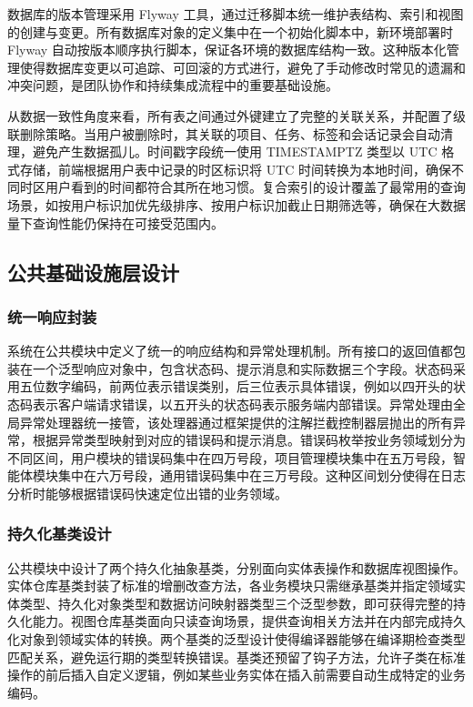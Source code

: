\par 数据库的版本管理采用 Flyway 工具，通过迁移脚本统一维护表结构、索引和视图的创建与变更。所有数据库对象的定义集中在一个初始化脚本中，新环境部署时 Flyway 自动按版本顺序执行脚本，保证各环境的数据库结构一致。这种版本化管理使得数据库变更以可追踪、可回滚的方式进行，避免了手动修改时常见的遗漏和冲突问题，是团队协作和持续集成流程中的重要基础设施。

\par 从数据一致性角度来看，所有表之间通过外键建立了完整的关联关系，并配置了级联删除策略。当用户被删除时，其关联的项目、任务、标签和会话记录会自动清理，避免产生数据孤儿。时间戳字段统一使用 TIMESTAMPTZ 类型以 UTC 格式存储，前端根据用户表中记录的时区标识将 UTC 时间转换为本地时间，确保不同时区用户看到的时间都符合其所在地习惯。复合索引的设计覆盖了最常用的查询场景，如按用户标识加优先级排序、按用户标识加截止日期筛选等，确保在大数据量下查询性能仍保持在可接受范围内。


\subsection{公共基础设施层设计}

\subsubsection{统一响应封装}

\par 系统在公共模块中定义了统一的响应结构和异常处理机制。所有接口的返回值都包装在一个泛型响应对象中，包含状态码、提示消息和实际数据三个字段。状态码采用五位数字编码，前两位表示错误类别，后三位表示具体错误，例如以四开头的状态码表示客户端请求错误，以五开头的状态码表示服务端内部错误。异常处理由全局异常处理器统一接管，该处理器通过框架提供的注解拦截控制器层抛出的所有异常，根据异常类型映射到对应的错误码和提示消息。错误码枚举按业务领域划分为不同区间，用户模块的错误码集中在四万号段，项目管理模块集中在五万号段，智能体模块集中在六万号段，通用错误码集中在三万号段。这种区间划分使得在日志分析时能够根据错误码快速定位出错的业务领域。

\subsubsection{持久化基类设计}

\par 公共模块中设计了两个持久化抽象基类，分别面向实体表操作和数据库视图操作。实体仓库基类封装了标准的增删改查方法，各业务模块只需继承基类并指定领域实体类型、持久化对象类型和数据访问映射器类型三个泛型参数，即可获得完整的持久化能力。视图仓库基类面向只读查询场景，提供查询相关方法并在内部完成持久化对象到领域实体的转换。两个基类的泛型设计使得编译器能够在编译期检查类型匹配关系，避免运行期的类型转换错误。基类还预留了钩子方法，允许子类在标准操作的前后插入自定义逻辑，例如某些业务实体在插入前需要自动生成特定的业务编码。

